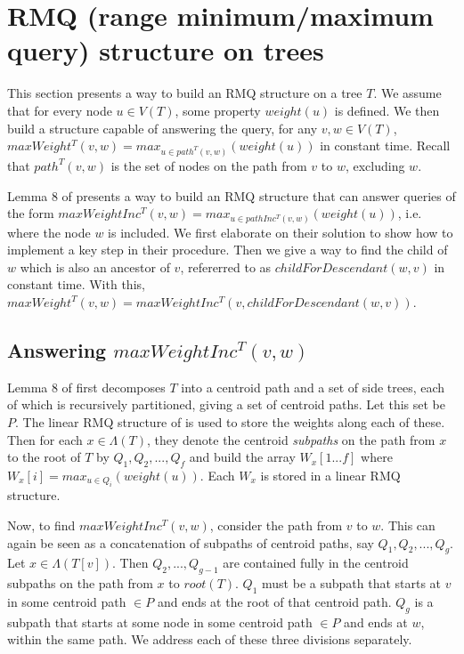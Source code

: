 \documentclass{article}
\newcommand{\leafset}{\Lambda}
\begin{document}
    \section{RMQ (range minimum/maximum query) structure on trees}
    \label{sec:rmqstructure}

    This section presents a way to build an RMQ structure on a tree $T$. We assume that for every node $u \in V(T)$, some property $weight(u)$ is defined. We then build a structure capable of answering the query, for any $v, w \in V(T)$, $maxWeight^T(v, w) = max_{u \in path^{T}(v, w)}(weight(u))$ in constant time. Recall that $path^{T}(v, w)$ is the set of nodes on the path from $v$ to $w$, excluding $w$.

    Lemma 8 of \cite{jansson2018algorithms} presents a way to build an RMQ structure that can answer queries of the form $maxWeightInc^T(v, w) = max_{u \in pathInc^{T}(v, w)}(weight(u))$, i.e. where the node $w$ is included. We first elaborate on their solution to show how to implement a key step in their procedure. Then we give a way to find the child of $w$ which is also an ancestor of $v$, refererred to as $childForDescendant(w, v)$ in constant time. With this, $maxWeight^T(v, w) = maxWeightInc^T(v, childForDescendant(w, v))$.

    \subsection{Answering $maxWeightInc^T(v, w)$}
    \label{subsec:answeringmaxweightinc}

    Lemma 8 of \cite{jansson2018algorithms} first decomposes $T$ into a centroid path and a set of side trees, each of which is recursively partitioned, giving a set of centroid paths. Let this set be $P$. The linear RMQ structure of \cite{bender2000lca} is used to store the weights along each of these. Then for each $x \in \leafset(T)$, they denote the centroid \textit{subpaths} on the path from $x$ to the root of $T$ by $Q_1, Q_2, ..., Q_f$ and build the array $W_x[1 ... f]$ where $W_x[i] = max_{u \in Q_i}(weight(u))$. Each $W_x$ is stored in a linear RMQ structure.

    Now, to find $maxWeightInc^T(v, w)$, consider the path from $v$ to $w$. This can again be seen as a concatenation of subpaths of centroid paths, say $Q_1, Q_2, ..., Q_g$. Let $x \in \leafset(T[v])$. Then $Q_2, ..., Q_{g - 1}$ are contained fully in the centroid subpaths on the path from $x$ to $root(T)$. $Q_1$ must be a subpath that starts at $v$ in some centroid path $\in P$ and ends at the root of that centroid path. $Q_g$ is a subpath that starts at some node in some centroid path $\in P$ and ends at $w$, within the same path. We address each of these three divisions separately.
\end{document}

